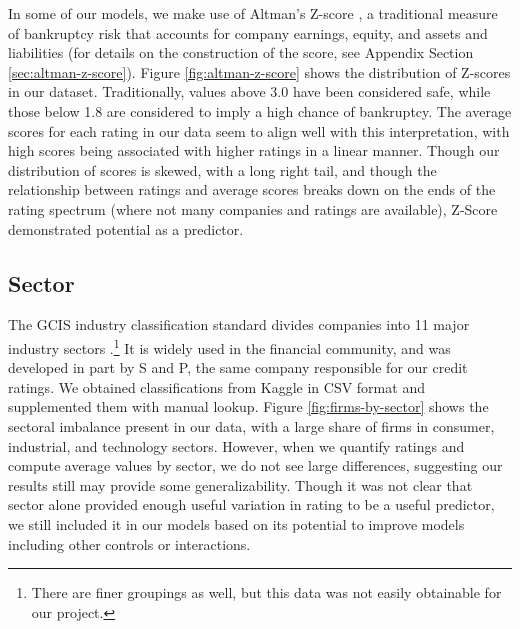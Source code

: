 \documentclass{article}[11pt]
\begin{document}
    In some of our models, we make use of Altman's Z-score \citep{altman_financial_1968}, a traditional measure of bankruptcy risk that accounts for company earnings, equity, and assets and liabilities (for details on the construction of the score, see Appendix Section \ref{sec:altman-z-score}). Figure \ref{fig:altman-z-score} shows the distribution of Z-scores in our dataset. Traditionally, values above 3.0 have been considered safe, while those below 1.8 are considered to imply a high chance of bankruptcy.  The average scores for each rating in our data seem to align well with this interpretation, with high scores being associated with higher ratings in a linear manner. Though our distribution of scores is skewed, with a long right tail, and though the relationship between ratings and average scores breaks down on the ends of the rating spectrum (where not many companies and ratings are available), Z-Score demonstrated potential as a predictor.
      
    \subsection*{Sector}

    The GCIS industry classification standard divides companies into 11 major industry sectors \citep{s_and_p_gics_2024}.\footnote{There are finer groupings as well, but this data was not easily obtainable for our project.} It is widely used in the financial community, and was developed in part by S and P, the same company responsible for our credit ratings. We obtained classifications from Kaggle in CSV format \citep{kozlov_us_2022} and supplemented them with manual lookup. Figure \ref{fig:firms-by-sector} shows the sectoral imbalance present in our data, with a large share of firms in consumer, industrial, and technology sectors. However, when we quantify ratings and compute average values by sector, we do not see large differences, suggesting our results still may provide some generalizability. Though it was not clear that sector alone provided enough useful variation in rating to be a useful predictor, we still included it in our models based on its potential to improve models including other controls or interactions.
\end{document}
